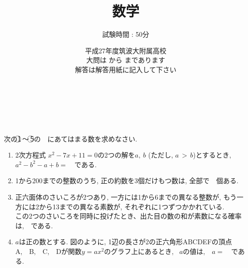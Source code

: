 \documentclass[dvipdfmx, titlepage, 11pt]{jsarticle}
\title{\Huge 数学}
\author{\LARGE 試験時間 : 50分}
\date{\LARGE 平成27年度筑波大附属高校\\[3cm] 大問は \fbox{\Large {\bf 1}} から \fbox{\Large {\bf 5}} まであります\\[0.5cm] 解答は解答用紙に記入して下さい}
\begin{document}
\maketitle


\newpage
\thispagestyle{empty}
　
\newpage

\newpage
\thispagestyle{empty}
　
\newpage

\setcounter{page}{1}
\noindent {}\hspace{10pt} 次の\textcircled{\scriptsize 1}\,〜\,\textcircled{\scriptsize 5}の\ \fbox{　\hspace{10pt} }\ にあてはまる数を求めなさい.
\begin{enumerate}[(1)]
\item 2次方程式 $x^{2}-7x+11=0$の2つの解を$a,\ b$ (ただし, $a\,>\,b$)とするとき, $a^{2}-b^{2}-a+b=$\ \ である.\\[6.8cm]
\item 1から200までの整数のうち, 正の約数を3個だけもつ数は, 全部で\ \ 個ある.
  \newpage
\item 正六面体のさいころが2つあり, 一方には1から6までの異なる整数が, もう一方には2から13までの異なる素数が, それぞれに1つずつかかれている.\\
  この2つのさいころを同時に投げたとき、出た目の数の和が素数になる確率は,\ \ である.\\[4cm]
\item $a$は正の数とする. 図のように, 1辺の長さが2の正六角形ABCDEFの頂点A,\ \ B,\ \ C,\ \ Dが関数$y = ax^{2}$のグラフ上にあるとき, \ $a$の値は,\ \ $a = $\ \ である.

\end{enumerate}
\end{document}
